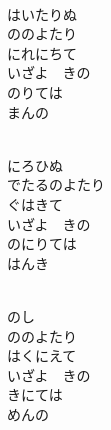 \documentclass[10pt,b5j]{tarticle} %
\begin{document}
\vspace{1.5em} %
\newcommand{\linespace}{0.5em} %
\newcommand{\blocksize}{0.5\hsize} %
\newcommand{\itemmargin}{3em} %
\begin{enumerate} %
    \setlength{\itemindent}{\itemmargin} %
    \begin{minipage}[c]{\blocksize}
    
        \vspace{\linespace}
        \item~\\
        はいたりぬ\\
        ののよたり\\
        にれにちて\\
        いざよ　きの\\
        のりては\\
        まんの
        
    \end{minipage}
    \begin{minipage}[c]{\blocksize}
        
        \vspace{\linespace}
        \item~\\
        にろひぬ\\
        でたるのよたり\\
        ぐはきて\\
        いざよ　きの\\
        のにりては\\
        はんき
        
    \end{minipage}
    \begin{minipage}[c]{\blocksize}
        
        \vspace{\linespace}
        \item~\\
        のし\\
        ののよたり\\
        はくにえて\\
        いざよ　きの\\
        きにては\\
        めんの
    
    \end{minipage}
\end{enumerate} %
\end{document}
